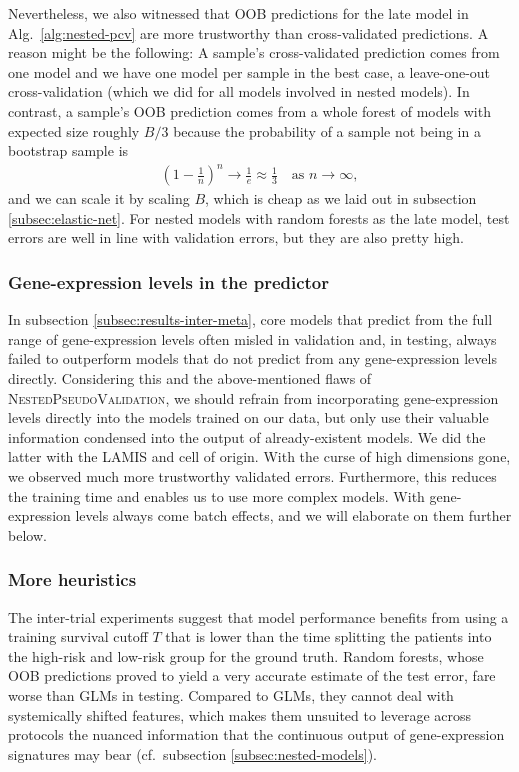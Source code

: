 Nevertheless, we also witnessed that OOB predictions for the late model in Alg.\ 
\ref{alg:nested-pcv} are more trustworthy than cross-validated predictions. A reason might be the 
following: A sample's cross-validated prediction comes 
from one model and we have one model per sample in the best case, a leave-one-out cross-validation 
(which we did for all models involved in nested models). In contrast, a sample's OOB prediction 
comes from a whole forest of models with expected size roughly $B/3$ because the probability of a 
sample not being in a bootstrap sample is
\begin{align}
    \left( 1 - \frac{1}{n} \right)^n \to \frac{1}{e} \approx \frac{1}{3} \quad \text{as } n \to 
    \infty,
\end{align}
and we can scale it by scaling $B$, which is cheap as we laid out in subsection 
\ref{subsec:elastic-net}. For nested models with random forests as the late model, test errors 
are well in line with validation errors, but they are also pretty high.

\subsubsection{Gene-expression levels in the predictor}

In subsection \ref{subsec:results-inter-meta}, core models that predict from the full range
of gene-expression levels often misled in validation and, in testing, always failed to outperform 
models that do not predict from any gene-expression levels directly.
Considering this and the above-mentioned flaws of \textsc{NestedPseudoValidation}, we should refrain from 
incorporating gene-expression levels directly into the models 
trained on our data, but only use their valuable information condensed into the output of 
already-existent models. We did the latter with the LAMIS and cell of origin. With the curse of high 
dimensions gone, we observed much more 
trustworthy validated errors. Furthermore, this reduces the training time and enables us to use 
more complex models.  With gene-expression levels 
always come batch effects, and we will elaborate on them further below.

\subsubsection{More heuristics}

The inter-trial experiments suggest that model performance benefits from using a training 
survival cutoff $T$ that is lower than the time splitting the patients into the high-risk and 
low-risk group for the ground truth. Random forests, whose OOB predictions proved to yield a very 
accurate estimate of the test error, fare worse than GLMs in testing. Compared to GLMs, they 
cannot deal with systemically shifted features, which makes them unsuited to leverage across 
protocols the nuanced information that the continuous output of gene-expression signatures 
may bear (cf.\ subsection \ref{subsec:nested-models}).

